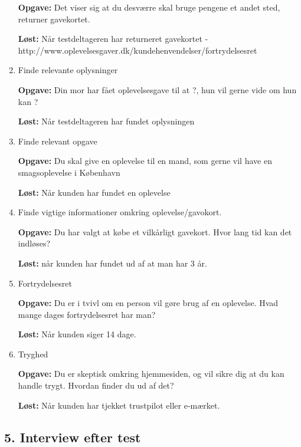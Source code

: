 \documentclass[12pt,a4paper,oneside]{article}
\begin{document}
\begin{enumerate}
\textbf{Opgave:} Det viser sig at du desværre skal bruge pengene et andet sted, returner gavekortet.

\textbf{Løst:} Når testdeltageren har returneret gavekortet - http://www.oplevelsesgaver.dk/kundehenvendelser/fortrydelsesret

\item{Finde relevante oplysninger}

\textbf{Opgave:} Din mor har fået oplevelsesgave til at ?, hun vil gerne vide om hun kan ?

\textbf{Løst:} Når testdeltageren har fundet oplysningen

\item{Finde relevant opgave}

\textbf{Opgave:} Du skal give en oplevelse til en mand, som gerne vil have en smagsoplevelse i København

\textbf{Løst:} Når kunden har fundet en oplevelse

\item{Finde vigtige informationer omkring oplevelse/gavokort.}

\textbf{Opgave:} Du har valgt at købe et vilkårligt gavekort. Hvor lang tid kan det indløses?

\textbf{Løst:} når kunden har fundet ud af at man har 3 år.

\item{Fortrydelsesret}

\textbf{Opgave:} Du er i tvivl om en person vil gøre brug af en oplevelse. Hvad mange dages fortrydelsesret har man?

\textbf{Løst:} Når kunden siger 14 dage.

\item{Tryghed}

\textbf{Opgave:} Du er skeptisk omkring hjemmesiden, og vil sikre dig at du kan handle trygt. Hvordan finder du ud af det?

\textbf{Løst:} Når kunden har tjekket trustpilot eller e-mærket.

\end{enumerate}

\subsection{5. Interview efter test}
\end{document}
